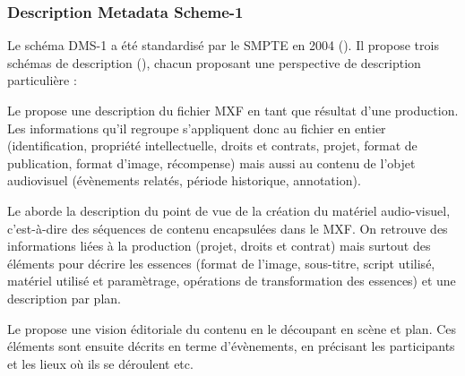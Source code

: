 \subsubsection{Description Metadata Scheme-1}\label{sec:dms-1}
Le schéma DMS-1 a été standardisé par le SMPTE en 2004 (\cite{Smpte2004}).
Il propose trois schémas de description (), chacun proposant une perspective de description particulière : 
\begin{liste}
	\item Le  propose une description du fichier MXF en tant que résultat d'une production. 
	Les informations qu'il regroupe s'appliquent donc au fichier en entier (identification, propriété intellectuelle, droits et contrats, projet, format de publication, format d'image, récompense) mais aussi au contenu de l'objet audiovisuel (évènements relatés, période historique, annotation).

	\item Le  aborde la description du point de vue de la création du matériel audio-visuel, c'est-à-dire des séquences de contenu encapsulées dans le MXF. 
	On retrouve des informations liées à la production (projet, droits et contrat) mais surtout des éléments pour décrire les essences (format de l'image, sous-titre, script utilisé, matériel utilisé et paramètrage, opérations de transformation des essences) et une description par plan.

	\item Le  propose une vision éditoriale du contenu en le découpant en scène et plan. 
	Ces éléments sont ensuite décrits en terme d'évènements, en précisant les participants et les lieux où ils se déroulent etc.
\end{liste}

